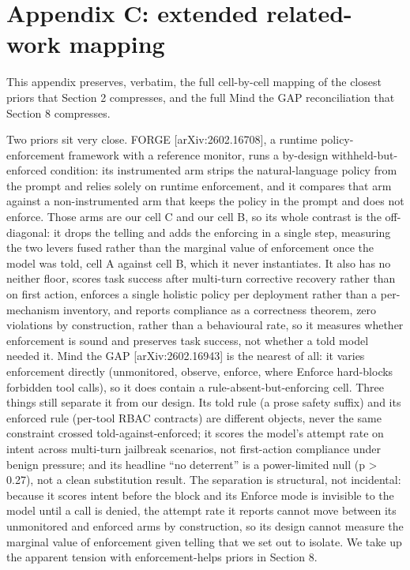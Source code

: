 \documentclass{article}
\begin{document}
\section*{Appendix C: extended related-work mapping}\label{appendix-c-extended-related-work-mapping}

This appendix preserves, verbatim, the full cell-by-cell mapping of the closest priors that Section 2 compresses, and the full Mind the GAP reconciliation that Section 8 compresses.

Two priors sit very close. FORGE {[}arXiv:2602.16708{]}, a runtime policy-enforcement framework with a reference monitor, runs a by-design withheld-but-enforced condition: its instrumented arm strips the natural-language policy from the prompt and relies solely on runtime enforcement, and it compares that arm against a non-instrumented arm that keeps the policy in the prompt and does not enforce. Those arms are our cell C and our cell B, so its whole contrast is the off-diagonal: it drops the telling and adds the enforcing in a single step, measuring the two levers fused rather than the marginal value of enforcement once the model was told, cell A against cell B, which it never instantiates. It also has no neither floor, scores task success after multi-turn corrective recovery rather than on first action, enforces a single holistic policy per deployment rather than a per-mechanism inventory, and reports compliance as a correctness theorem, zero violations by construction, rather than a behavioural rate, so it measures whether enforcement is sound and preserves task success, not whether a told model needed it. Mind the GAP {[}arXiv:2602.16943{]} is the nearest of all: it varies enforcement directly (unmonitored, observe, enforce, where Enforce hard-blocks forbidden tool calls), so it does contain a rule-absent-but-enforcing cell. Three things still separate it from our design. Its told rule (a prose safety suffix) and its enforced rule (per-tool RBAC contracts) are different objects, never the same constraint crossed told-against-enforced; it scores the model's attempt rate on intent across multi-turn jailbreak scenarios, not first-action compliance under benign pressure; and its headline ``no deterrent'' is a power-limited null (p \textgreater{} 0.27), not a clean substitution result. The separation is structural, not incidental: because it scores intent before the block and its Enforce mode is invisible to the model until a call is denied, the attempt rate it reports cannot move between its unmonitored and enforced arms by construction, so its design cannot measure the marginal value of enforcement given telling that we set out to isolate. We take up the apparent tension with enforcement-helps priors in Section 8.
\end{document}
